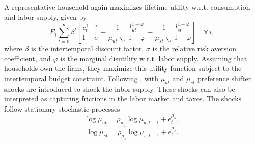 \documentclass[compress,xcolor=dvipsnames]{beamer}
\begin{document}
\begin{frame}
A representative household again maximizes lifetime utility w.r.t. consumption and labor supply, given by
\begin{equation} \label{eq:FUT}
E_t\sum_{t=0}^\infty \beta^t\left[\frac{c_t^{1-\sigma}}{1-\sigma}-\frac{1}{\mu_{ut}\varsigma_u}\frac{l_{ut}^{1+\varphi}}{1+\varphi}-\frac{1}{\mu_{st}\varsigma_s}\frac{l_{st}^{1+\varphi}}{1+\varphi}\right]\quad\forall\,i,
\end{equation}
where $\beta$ is the intertemporal discount factor, $\sigma$ is the relative risk aversion coefficient, and $\varphi$ is the marginal disutility w.r.t. labor supply. Assuming that households own the firms, they maximize this utility function subject to the intertemporal budget constraint. Following \citet{Comin2009}, with $\mu_{ut}$ and $\mu_{st}$ preference shifter shocks are introduced to shock the labor supply. These shocks can also be interpreted as capturing frictions in the labor market and taxes. The shocks follow stationary stochastic processes
\begin{equation}
\log \mu_{ut} = \rho_{\mu_u} \log \mu_{u,t-1} +\epsilon_t^{\mu_u},
\end{equation}
\begin{equation}
\log \mu_{st} = \rho_{\mu_s} \log \mu_{s,t-1} +\epsilon_t^{\mu_s}.
\end{equation}
\end{frame}
\end{document}
